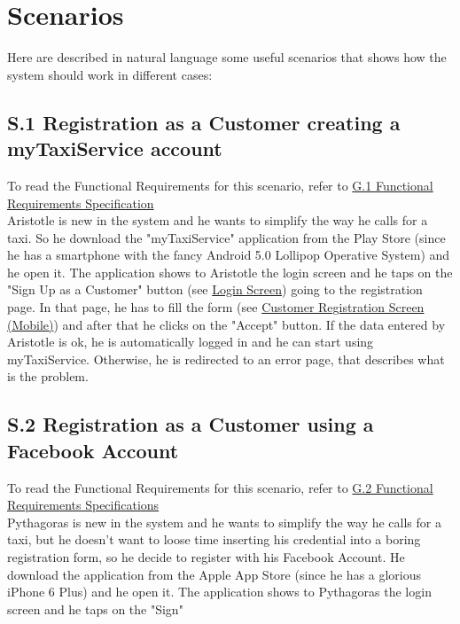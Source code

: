 \section{Scenarios}
	Here are described in natural language some useful scenarios that shows how the system should work in different cases:

		\subsection{S.1 Registration as a Customer creating a myTaxiService account}\label{sec:NormalCustomerRegistrationScenario}
		To read the Functional Requirements for this scenario, refer to \hyperref[sec:frs1]{G.1 Functional Requirements Specification}\\

		Aristotle is new in the system and he wants to simplify the way he calls for a taxi. So he download the "myTaxiService" application from the Play Store (since he has a smartphone with the fancy Android 5.0 Lollipop Operative System) and he open it.
		The application shows to Aristotle the login screen and he taps on the "Sign Up as a Customer" button (see \hyperref[login_m]{Login Screen}) going to the registration page. In that page, he has to fill the form (see \hyperref[cregistration_m]{Customer Registration Screen (Mobile)}) and after that he clicks on the "Accept" button. If the data entered by Aristotle is ok, he is automatically logged in and he can start using myTaxiService. Otherwise, he is redirected to an error page, that describes what is the problem. 

		\subsection{S.2 Registration as a Customer using a Facebook Account}\label{sec:FacebookCustomerRegistrationScenario}
		To read the Functional Requirements for this scenario, refer to \hyperref[sec:frs2]{G.2 Functional Requirements Specifications}\\

		Pythagoras is new in the system and he wants to simplify the way he calls for a taxi, but he doesn't want to loose time inserting his credential into a boring registration form, so he decide to register with his Facebook Account.
		He download the application from the Apple App Store (since he has a glorious iPhone 6 Plus) and he open it.
		The application shows to Pythagoras the login screen and he taps on the "Sign" 